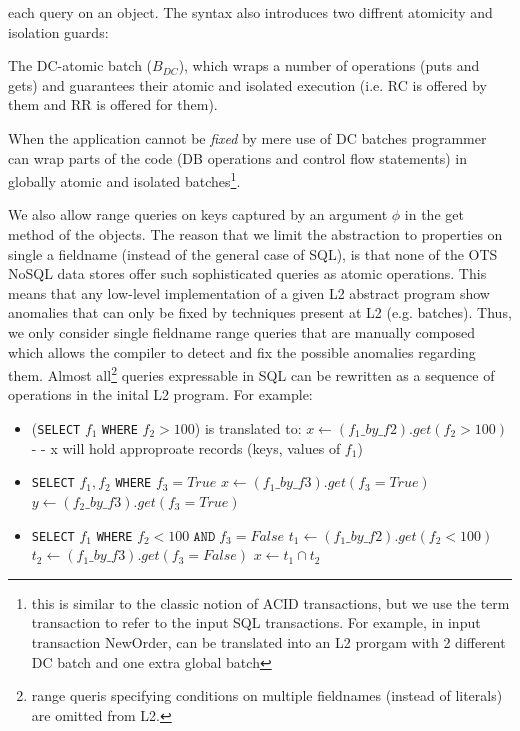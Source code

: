 \documentclass[12pt,letter]{article}
\begin{document}
each query on an object. 
The syntax also introduces two diffrent atomicity and isolation guards: 
\begin{enumerate*}[label=(\roman*)]
  \item The DC-atomic batch ($B_{DC}$), which wraps a number of 
	  operations (puts and gets) and guarantees their atomic and isolated
	  execution (i.e. RC is offered by them and RR is offered for them). 
  \item When the application cannot be \emph{fixed} by mere use of DC batches 
	  programmer can wrap parts of the code (DB operations and control flow
	  statements) in globally atomic and isolated batches\footnote{this is similar
	  to the classic notion of ACID transactions, but we use the term
	  transaction to refer to the input SQL transactions. For example, in
	  input transaction NewOrder, can be translated into an L2 prorgam with
  2 different DC batch and one extra global batch}.
\end{enumerate*}

We also allow range queries on keys captured by an argument $\phi$ in the get
method of the objects. The reason that we limit the abstraction to properties on
single a fieldname 
(instead of the general case of SQL), is that none of the OTS NoSQL data stores offer such
sophisticated queries as atomic operations. This means that any
low-level implementation of a given L2 abstract program show anomalies that can
only be fixed by techniques present at L2 (e.g. batches). Thus, we only consider
single fieldname range queries that are manually composed which allows the
compiler to detect and fix the possible anomalies regarding them.
Almost all\footnote{range queris specifying
conditions on multiple fieldnames (instead of literals) are omitted from L2.} queries expressable in SQL can be
rewritten as a sequence of operations in the inital L2 program. For example:
\begin{itemize}
	\item (\texttt{SELECT} $f_1$ \texttt{WHERE} $f_2 > 100$) is translated to:
		\subitem $ x \leftarrow (f_1\_by\_f2).get(f_2>100)$ 
		\subitem - - x will hold approproate records
		(keys, values of $f_1$)
		
	\item \texttt{SELECT}  $f_1,f_2$ \texttt{WHERE}  $f_3=True$
		\subitem $ x \leftarrow (f_1\_by\_f3).get(f_3=True)$ 
		\subitem $ y \leftarrow (f_2\_by\_f3).get(f_3=True)$ 
	\item \texttt{SELECT}  $f_1$ \texttt{WHERE}  $f_2<100 \; \texttt{AND} \;
		f_3=False$
		\subitem $ t_1 \leftarrow (f_1\_by\_f2).get(f_2<100)$ 
		\subitem $ t_2 \leftarrow (f_1\_by\_f3).get(f_3=False)$
		\subitem $x\leftarrow t_1\cap t_2$
\end{itemize}
\end{document}
